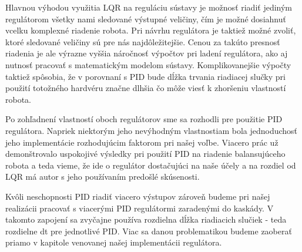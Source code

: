 Hlavnou výhodou využitia LQR na reguláciu sústavy je možnosť riadiť jediným regulátorom všetky nami sledované výstupné veličiny, čím je možné dosiahnuť vcelku komplexné riadenie robota. Pri návrhu regulátora je taktiež možné zvoliť, ktoré sledované veličiny sú pre nás najdôležitejšie. Cenou za takúto presnosť riadenia je ale výrazne vyššia náročnosť výpočtov pri ladení regulátora, ako aj nutnosť pracovať s matematickým modelom sústavy. Komplikovanejšie výpočty taktiež spôsobia, že v porovnaní s PID bude dĺžka trvania riadiacej slučky pri použití totožného hardvéru značne dlhšia čo môže viesť k zhoršeniu vlastností robota.

Po zohľadnení vlastností oboch regulátorov sme sa rozhodli pre použitie PID regulátora. Napriek niektorým jeho nevýhodným vlastnostiam bola jednoduchosť jeho implementácie rozhodujúcim faktorom pri našej voľbe. Viacero prác už demonštrovalo uspokojivé výsledky pri použití PID na riadenie balansujúceho robota a teda vieme, že ide o regulátor dostačujúci na naše účely a na rozdiel od LQR má autor s jeho používaním predošlé skúsenosti. 

Kvôli neschopnosti PID riadiť viacero výstupov zároveň budeme pri našej realizácii pracovať s viacerými PID regulátormi zaradenými do kaskády. V takomto zapojení sa zvyčajne používa rozdielna dĺžka riadiacich slučiek - teda  rozdielne dt pre jednotlivé PID. Viac sa danou problematikou budeme zaoberať priamo v kapitole venovanej našej implementácii regulátora.